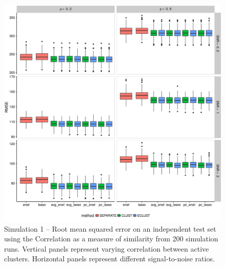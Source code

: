 \begin{figure}[H]
	\centering
	\includegraphics[scale=0.6, keepaspectratio]{./figs/hydra/results/figures/sim1-sept10/RMSE_Correlation_sim1.png}
	\caption{Simulation 1 -- Root mean squared error on an independent test set using the Correlation as a measure of similarity from 200 simulation runs. Vertical panels represent varying correlation between active clusters. Horizontal panels represent different signal-to-noise ratios.}
	\label{fig:RMSE_Correlation_sim1}
\end{figure}

